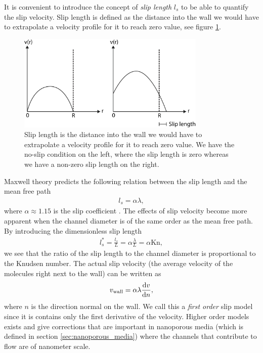It is convenient to introduce the concept of \textit{slip length} $l_s$ to be able to quantify the slip velocity. Slip length is defined as the distance into the wall we would have to extrapolate a velocity profile for it to reach zero value, see figure \ref{fig:slip_length}.
\begin{figure}[h!]
\begin{center}
\includegraphics[width=0.8\textwidth, trim=0cm 0cm 0cm 0cm, clip]{DSMC/figures/slip_length.eps}
\end{center}
\caption{Slip length is the distance into the wall we would have to extrapolate a velocity profile for it to reach zero value. We have the no-slip condition on the left, where the slip length is zero whereas we have a non-zero slip length on the right.}
\label{fig:slip_length}
\end{figure}
Maxwell theory predicts the following relation between the slip length and the mean free path
\begin{align}
	\label{eq:noslip_sliplength}
	l_s = \alpha \lambda,
\end{align}
where $\alpha\approx 1.15$ is the slip coefficient \cite{morris1992slip}. The effects of slip velocity become more apparent when the channel diameter is of the same order as the mean free path. By introducing the dimensionless slip length
\begin{align}
	l_s^* = \frac{l_s}{ L} = \alpha \frac{\lambda }{ L} = \alpha \text{Kn},
\end{align}
we see that the ratio of the slip length to the channel diameter is proportional to the Knudsen number. The actual slip velocity (the average velocity of the molecules right next to the wall) can be written as
\begin{align}
	\label{eq:linear_slip_velocity}
	v_{\text{wall}} = \alpha\lambda\frac{\mathrm{d}v}{\mathrm{d}n},
\end{align}
where $n$ is the direction normal on the wall\cite{klinkenberg1941permeability}. We call this a \textit{first order} slip model since it is contains only the first derivative of the velocity. Higher order models exists and give corrections that are important in nanoporous media (which is defined in section \ref{sec:nanoporous_media}) where the channels that contribute to flow are of nanometer scale.

